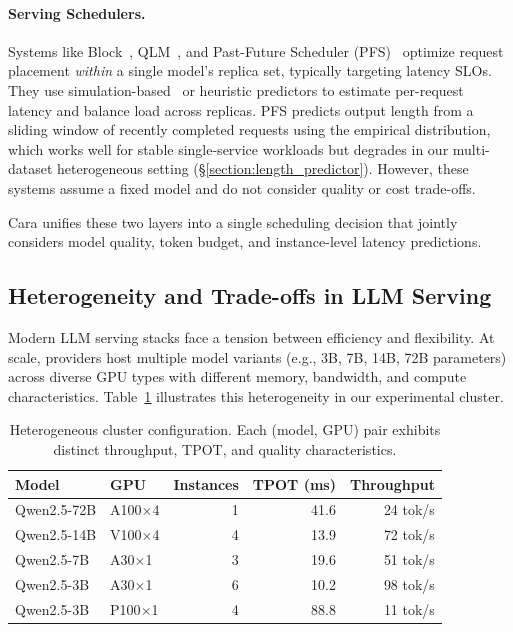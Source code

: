 \documentclass[letterpaper, anonymous, twocolumn, 10pt]{article}
\begin{document}
\paragraph{Serving Schedulers.}
Systems like Block~\cite{da2025blockbalancingloadllm}, QLM~\cite{qlm}, and Past-Future Scheduler (PFS)~\cite{Gong_2025} optimize request placement \emph{within} a single model's replica set, typically targeting latency SLOs.
They use simulation-based~\cite{Agrawal2024VidurAL, SamuLLM} or heuristic predictors to estimate per-request latency and balance load across replicas.
PFS predicts output length from a sliding window of recently completed requests using the empirical distribution, which works well for stable single-service workloads but degrades in our multi-dataset heterogeneous setting (\S\ref{section:length_predictor}).
However, these systems assume a fixed model and do not consider quality or cost trade-offs.

Cara unifies these two layers into a single scheduling decision that jointly considers model quality, token budget, and instance-level latency predictions.

\subsection{Heterogeneity and Trade-offs in LLM Serving}\label{section:heterogeneity}

Modern LLM serving stacks face a tension between efficiency and flexibility.
At scale, providers host multiple model variants (e.g., 3B, 7B, 14B, 72B parameters) across diverse GPU types with different memory, bandwidth, and compute characteristics.
Table~\ref{tab:heterogeneous_cluster} illustrates this heterogeneity in our experimental cluster.

\begin{table}[t]
\centering
\small
\caption{Heterogeneous cluster configuration. Each (model, GPU) pair exhibits distinct throughput, TPOT, and quality characteristics.}
\label{tab:heterogeneous_cluster}
\begin{tabular}{llrrr}
\hline
Model & GPU & Instances & TPOT (ms) & Throughput \\
\hline
Qwen2.5-72B & A100$\times$4 & 1 & 41.6 & 24 tok/s \\
Qwen2.5-14B & V100$\times$4 & 4 & 13.9 & 72 tok/s \\
Qwen2.5-7B & A30$\times$1 & 3 & 19.6 & 51 tok/s \\
Qwen2.5-3B & A30$\times$1 & 6 & 10.2 & 98 tok/s \\
Qwen2.5-3B & P100$\times$1 & 4 & 88.8 & 11 tok/s \\
\hline
\end{tabular}
\end{table}
\end{document}
